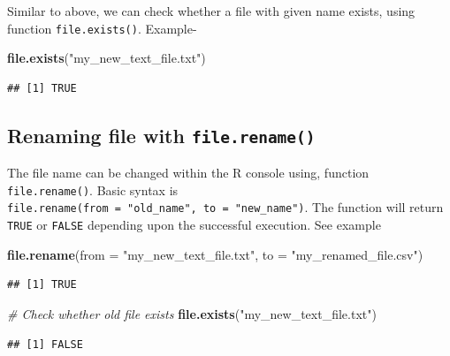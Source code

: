 \documentclass[
]{book}
\newenvironment{Shaded}{\begin{snugshade}}{\end{snugshade}}
\newcommand{\AttributeTok}[1]{\textcolor[rgb]{0.13,0.29,0.53}{#1}}
\newcommand{\CommentTok}[1]{\textcolor[rgb]{0.56,0.35,0.01}{\textit{#1}}}
\newcommand{\FunctionTok}[1]{\textcolor[rgb]{0.13,0.29,0.53}{\textbf{#1}}}
\newcommand{\NormalTok}[1]{#1}
\newcommand{\StringTok}[1]{\textcolor[rgb]{0.31,0.60,0.02}{#1}}
\begin{document}
Similar to above, we can check whether a file with given name exists, using function \texttt{file.exists()}. Example-

\begin{Shaded}
\begin{Highlighting}[]
\FunctionTok{file.exists}\NormalTok{(}\StringTok{"my\_new\_text\_file.txt"}\NormalTok{)}
\end{Highlighting}
\end{Shaded}

\begin{verbatim}
## [1] TRUE
\end{verbatim}

\hypertarget{renaming-file-with-file.rename}{%
\subsection{\texorpdfstring{Renaming file with \texttt{file.rename()}}{Renaming file with file.rename()}}\label{renaming-file-with-file.rename}}

The file name can be changed within the R console using, function \texttt{file.rename()}. Basic syntax is \texttt{file.rename(from\ =\ "old\_name",\ to\ =\ "new\_name")}. The function will return \texttt{TRUE} or \texttt{FALSE} depending upon the successful execution. See example

\begin{Shaded}
\begin{Highlighting}[]
\FunctionTok{file.rename}\NormalTok{(}\AttributeTok{from =} \StringTok{"my\_new\_text\_file.txt"}\NormalTok{, }\AttributeTok{to =} \StringTok{"my\_renamed\_file.csv"}\NormalTok{)}
\end{Highlighting}
\end{Shaded}

\begin{verbatim}
## [1] TRUE
\end{verbatim}

\begin{Shaded}
\begin{Highlighting}[]
\CommentTok{\# Check whether old file exists}
\FunctionTok{file.exists}\NormalTok{(}\StringTok{"my\_new\_text\_file.txt"}\NormalTok{)}
\end{Highlighting}
\end{Shaded}

\begin{verbatim}
## [1] FALSE
\end{verbatim}
\end{document}
